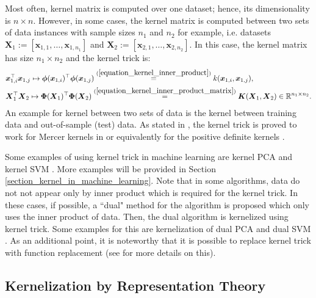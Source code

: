 \documentclass[lang=cn,10pt]{gorgeousnbook}
\numberwithin{equation}{section}%
\numberwithin{figure}{section}%
\begin{document}
Most often, kernel matrix is computed over one dataset; hence, its dimensionality is $n \times n$. 
However, in some cases, the kernel matrix is computed between two sets of data instances with sample sizes $n_1$ and $n_2$ for example, i.e. datasets $\boldsymbol{X}_1 := [\boldsymbol{x}_{1,1}, \dots, \boldsymbol{x}_{1,n_1}]$ and $\boldsymbol{X}_2 := [\boldsymbol{x}_{2,1}, \dots, \boldsymbol{x}_{2,n_2}]$. In this case, the kernel matrix has size $n_1 \times n_2$ and the kernel trick is:
\begin{align}
&\boldsymbol{x}_{1,i}^\top \boldsymbol{x}_{1,j} \mapsto \boldsymbol{\phi}(\boldsymbol{x}_{1,i})^\top \boldsymbol{\phi}(\boldsymbol{x}_{1,j}) \overset{(\ref{equation_kernel_inner_product})}{=} k(\boldsymbol{x}_{1,i}, \boldsymbol{x}_{1,j}), \label{equation_kernel_trick_two_sets} \\
&\boldsymbol{X}_1^\top \boldsymbol{X}_2 \mapsto \boldsymbol{\Phi}(\boldsymbol{X}_1)^\top \boldsymbol{\Phi}(\boldsymbol{X}_2) \overset{(\ref{equation_kernel_inner_product_matrix})}{=} \boldsymbol{K}(\boldsymbol{X}_1, \boldsymbol{X}_2) \in \mathbb{R}^{n_1 \times n_2}.
\end{align}
An example for kernel between two sets of data is the kernel between training data and out-of-sample (test) data. 
As stated in \cite{scholkopf2001kernel}, the kernel trick is proved to work for Mercer kernels in \cite{boser1992training,vapnik1995nature} or equivalently for the positive definite kernels \cite{berg1984harmonic,wahba1990spline}.

Some examples of using kernel trick in machine learning are kernel PCA \cite{scholkopf1997kernel,scholkopf1998nonlinear,ghojogh2019unsupervised} and kernel SVM \cite{boser1992training,vapnik1995nature}.
More examples will be provided in Section \ref{section_kernel_in_machine_learning}.
Note that in some algorithms, data do not not appear only by inner product which is required for the kernel trick. In these cases, if possible, a ``dual" method for the algorithm is proposed which only uses the inner product of data. Then, the dual algorithm is kernelized using kernel trick. Some examples for this are kernelization of dual PCA \cite{ghojogh2019unsupervised} and dual SVM \cite{burges1998tutorial}. 
As an additional point, it is noteworthy that it is possible to replace kernel trick with function replacement (see \cite{ma2003function} for more details on this). 


\subsection{Kernelization by Representation Theory}
\end{document}
